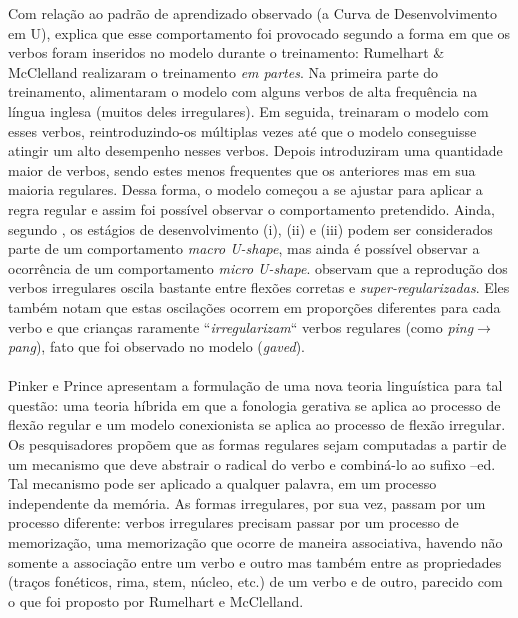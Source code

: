 Com relação ao padrão de aprendizado observado (a Curva de Desenvolvimento em U), \cite{Pinker:1999} explica que esse comportamento foi provocado segundo a forma em que os verbos foram inseridos no modelo durante o treinamento: Rumelhart & McClelland realizaram o treinamento \textit{em partes}. Na primeira parte do treinamento, alimentaram o modelo com alguns verbos de alta frequência na língua inglesa (muitos deles irregulares). Em seguida, treinaram o modelo com esses verbos, reintroduzindo-os múltiplas vezes até que o modelo conseguisse atingir um alto desempenho nesses verbos. Depois introduziram uma quantidade maior de verbos, sendo estes menos frequentes que os anteriores mas em sua maioria regulares. Dessa forma, o modelo começou a se ajustar para aplicar a regra regular e assim foi possível observar o comportamento pretendido. Ainda, segundo \cite{pluket:1991}, os estágios de desenvolvimento (i), (ii) e (iii) podem ser considerados parte de um comportamento \textit{macro U-shape}, mas ainda é possível observar a ocorrência de um comportamento \textit{micro U-shape}. \cite{pluket:1991} observam que a reprodução dos verbos irregulares oscila bastante entre flexões corretas e \textit{super-regularizadas}. Eles também notam que estas oscilações ocorrem em proporções diferentes para cada verbo e que crianças raramente “\textit{irregularizam}“ verbos regulares (como \textit{ping}$\rightarrow$\textit{pang}), fato que foi observado no modelo (\textit{gaved}).\\



\\
Pinker e Prince \citeyear{Pinker:1988} apresentam a formulação de uma nova teoria linguística para tal questão: uma teoria híbrida em que a fonologia gerativa se aplica ao processo de flexão regular e um modelo conexionista se aplica ao processo de flexão irregular. Os pesquisadores propõem que as formas regulares sejam computadas a partir de um mecanismo que deve abstrair o radical do verbo e combiná-lo ao sufixo –ed.  Tal mecanismo pode ser aplicado a qualquer palavra, em um processo independente da memória. As formas irregulares, por sua vez, passam por um processo diferente: verbos irregulares precisam passar por um processo de memorização, uma memorização que ocorre de maneira associativa, havendo não somente a associação entre um verbo e outro mas também entre as propriedades (traços fonéticos, rima, stem, núcleo, etc.) de um verbo e de outro, parecido com o que foi proposto por Rumelhart e McClelland.

